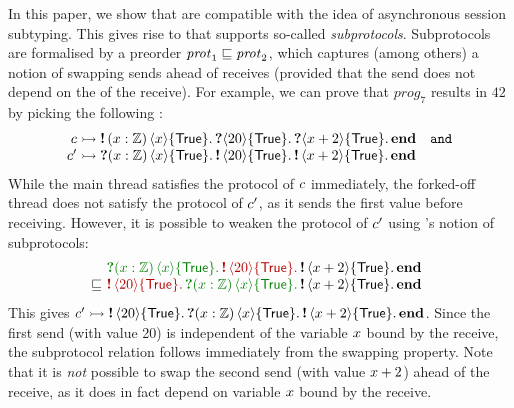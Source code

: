 In this paper, we show that \pname are compatible with the idea of asynchronous
session subtyping.
This gives rise to \textbf{} that supports
so-called \textit{subprotocols}.
Subprotocols are formalised by a preorder $\mathit{prot}_1 \sqsubseteq \mathit{prot}_2$,
which captures (among others) a notion of swapping sends ahead of receives
(provided that the send does not depend on the \binders of the receive).
For example, we can prove that $\mathit{prog}_7$ results in $42$ by picking the
following \pname:
\[
\begin{array}{@{} r @{} l l @{}}
\interp{\chan &{}}{
\sendprot{(\var:\integer)}{\var}{\TRUE}
\recvprot{}{20}{\TRUE}
\recvprot{}{\var+2}{\TRUE}
\protend} & \mathtt{and}\\
\interp{\chan' &{}}{
\recvprot{(\var:\integer)}{\var}{\TRUE}
\sendprot{}{20}{\TRUE}
\sendprot{}{\var+2}{\TRUE}
\protend}
\end{array}
\]
While the main thread satisfies the protocol of $c$ immediately, the
forked-off thread does not satisfy the protocol of $c'$, as it sends the
first
value before receiving.
However, it is possible to weaken the protocol of $c'$ using 's
notion of subprotocols:
\[\begin{array}{@{} l @{\ } l}
\subprot
{&
\color{darkgreen}\recvprot{(\var:\integer)}{\var}{\TRUE}
\color{darkred}\sendprot{}{20}{\TRUE}
\color{black}\sendprot{}{\var+2}{\TRUE}
\protend\\}
{&
\color{darkred}\sendprot{}{20}{\TRUE}
\color{darkgreen}\recvprot{(\var:\integer)}{\var}{\TRUE}
\color{black}\sendprot{}{\var+2}{\TRUE}
\protend}
\end{array}\]
This gives
$\interp{\chan'}{
\sendprot{}{20}{\TRUE}{
\recvprot{(\var:\integer)}{\var}{\TRUE}{
\sendprot{}{\var+2}{\TRUE}
\protend}}}
$.
Since the first send (with value 20) is independent of the variable
$x$ bound by the receive, the subprotocol relation follows immediately from
the swapping property.
Note that it is \textit{not} possible to swap the second send
(with value $x+2$) ahead of the receive, as it does in fact depend on variable
$x$ bound by the receive.

